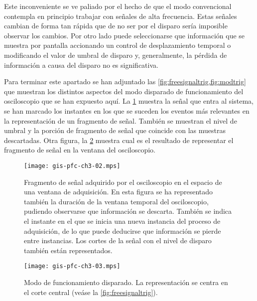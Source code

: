 Este inconveniente se ve paliado por el hecho de que el modo convencional
contempla en principio trabajar con señales de alta frecuencia. Estas
señales cambian de forma tan rápida que de no ser por el disparo sería
imposible observar los cambios. Por otro lado puede seleccionarse que
información que se muestra por pantalla accionando un control de
desplazamiento temporal o modificando el valor de umbral de disparo y,
generalmente, la pérdida de información a causa del disparo no es
significativa.

Para terminar este apartado se han adjuntado las
\cref{fig:freesignaltrig,fig:modtrig} que muestran los distintos aspectos
del modo disparado de funcionamiento del osciloscopio que se han expuesto
aquí. La \cref{fig:freesignaltrig} muestra la señal que entra al sistema,
se han marcado los instantes en los que se suceden los eventos más
relevantes en la representación de un fragmento de señal. También se
muestran el nivel de umbral y la porción de fragmento de señal que coincide
con las muestras descartadas. Otra figura, la \cref{fig:modtrig} muestra
cual es el resultado de representar el fragmento de señal en la ventana del
osciloscopio.

\begin{figure}
	\begin{center}
		\texttt{[image: gis-pfc-ch3-02.mps]}
	\end{center}
	\caption[Fragmento de señal adquirido por el osciloscopio en el
	espacio de una ventana de adquisición]{Fragmento de señal adquirido
	por el osciloscopio en el espacio de una ventana de adquisición. En
	esta figura se ha representado también la duración de la ventana
	temporal del osciloscopio, pudiendo observarse que información se
	descarta. También se indica el instante en el que se inicia una
	nueva instancia del proceso de adquisición, de lo que puede
	deducirse que información se pierde entre instancias. Los cortes de
	la señal con el nivel de disparo también están representados.}
	\label{fig:freesignaltrig}
\end{figure}

\begin{figure}
	\begin{center}
		\texttt{[image: gis-pfc-ch3-03.mps]}
	\end{center}
	\caption[Modo de funcionamiento disparado]{Modo de funcionamiento
	disparado. La representación se centra en el corte central (veáse
	la \vref{fig:freesignaltrig}).}
	\label{fig:modtrig}
\end{figure}


